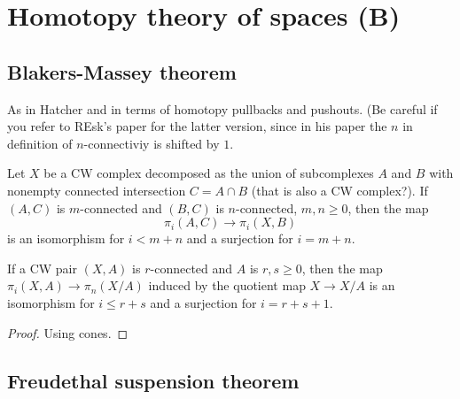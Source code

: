 \section{Homotopy theory  of spaces (B)}
\label{section-homotopy-theory-of-spaces-b}

\subsection{Blakers-Massey theorem}
\label{subsection-blakers-massey-theorem}

As in Hatcher and in terms of homotopy
pullbacks and pushouts. (Be careful if you
refer to REsk's paper for the latter version,
since in his paper the $n$ in definition of
$n$-connectiviy is shifted by $1$.
\begin{theorem}
\label{theorem-blake-masse-hatch-4-23-tom}
	Let $X$ be a CW complex decomposed as the
	union of subcomplexes $A$ and $B$ with
	nonempty connected intersection $C=A\cap B$
	(that is also a CW complex?). If $(A,C)$ is
	$m$-connected and $(B,C)$ is $n$-connected,
	$m,n\geq 0$, then the map
	$$\pi_{i}(A,C)\to \pi_{i}(X,B)$$
is an isomorphism for $i<m+n$ and a
surjection for $i=m+n$.
\end{theorem}

\begin{proposition}
\label{proposition-quoti-theor-hatch-4}
	If a CW pair $(X,A)$ is $r$-connected and
	$A$ is $r,s \geq 0$, then the map
	$\pi_{i}(X,A)\to \pi_{n}(X/A)$ induced by
	the quotient map $X\to X/A$ is an
	isomorphism for $i\leq r+s$ and a surjection
	for $i=r+s+1$.
\end{proposition}
\begin{proof}
	Using cones.
\end{proof}

\subsection{Freudethal suspension theorem}
\label{subsection-freud-suspe-theor}

